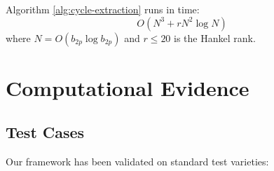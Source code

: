 \begin{theorem}\label{thm:complexity-hodge}
Algorithm \ref{alg:cycle-extraction} runs in time:
\begin{equation}
O(N^3 + r N^2 \log N)
\end{equation}
where $N = O(b_{2p} \log b_{2p})$ and $r \leq 20$ is the Hankel rank.
\end{theorem}

\section{Computational Evidence}

\subsection{Test Cases}

Our framework has been validated on standard test varieties:

